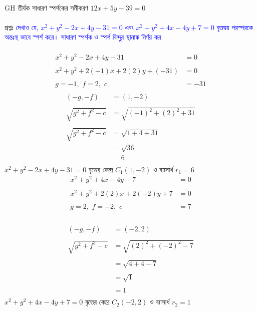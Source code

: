 \documentclass{article}
\begin{document}
	\\
	GH তীর্যক সাধারণ স্পর্শকের সমীকরণ  $12x+5y-39=0$\\
	\\
প্রশ্নঃ \textcolor{blue}{ দেখাও যে, $x^2+y^2-2x+4y-31=0$ এবং $x^2+y^2+4x-4y+7=0$ বৃত্তদ্বয় পরস্পরকে অন্তঃস্থ ভাবে স্পর্শ করে। সাধারণ স্পর্শক ও স্পর্শ বিন্দুর স্থানাঙ্ক নির্ণয় কর }\\ 
	\\
	\begin{align*}
		x^2+y^2-2x+4y-31&=0\\
		\\
		x^2+y^2+2(-1)x+2(2)y+(-31)&=0\\
		\\
		g=-1,\,\,f=2,\,\,c&=-31\\
	\end{align*}
	\begin{align*}
		(-g,-f)&=(1,-2)\\
		\\
		\sqrt{g^2+f^2-c}&=\sqrt{(-1)^2+(2)^2+31}\\
		\\
		\sqrt{g^2+f^2-c}&=\sqrt{1+4+31}\\
		&=\sqrt{36}\\
		&=6\\
	\end{align*}
	$x^2+y^2-2x+4y-31=0$ বৃত্তের কেন্দ্র  $C_1(1,-2)$ ও ব্যাসার্ধ  $r_1=6$\\
	\begin{align*}
		x^2+y^2+4x-4y+7&=0\\
		\\
		x^2+y^2+2(2)x+2(-2)y+7&=0\\
		\\
		g=2,\,\,f=-2,\,\,c&=7\\
	\end{align*}
	\\
	\begin{align*}
		(-g,-f)&=(-2,2)\\
		\\
		\sqrt{g^2+f^2-c}&=\sqrt{(2)^2+(-2)^2-7}\\
		\\
		&=\sqrt{4+4-7}\\
		\\
		&=\sqrt{1}\\
		\\
		&=1\\
	\end{align*}
	$x^2+y^2+4x-4y+7=0$ বৃত্তের কেন্দ্র  $C_2(-2,2)$ ও ব্যাসার্ধ  $r_2=1$\\
\end{document}
